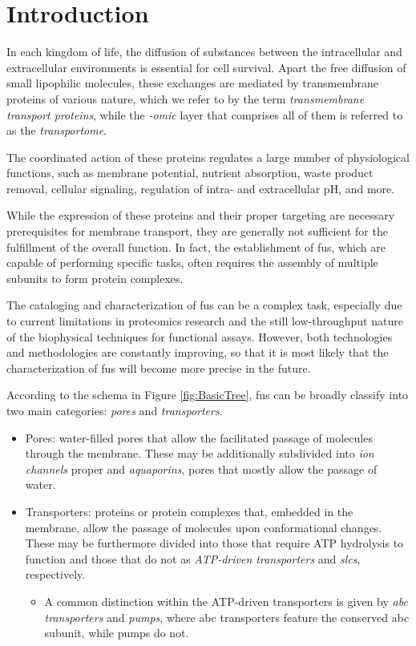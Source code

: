 \section{Introduction}

In each kingdom of life, the diffusion of substances between the intracellular and extracellular environments is essential for cell survival.
Apart the free diffusion of small lipophilic molecules, these exchanges are mediated by transmembrane proteins of various nature, which we refer to by the term \textit{transmembrane transport proteins}, while the \textit{-omic} layer that comprises all of them is referred to as the \textit{transportome}.

The coordinated action of these proteins regulates a large number of physiological functions, such as membrane potential, nutrient absorption, waste product removal, cellular signaling, regulation of intra- and extracellular pH, and more.

While the expression of these proteins and their proper targeting are necessary prerequisites for membrane transport, they are generally not sufficient for the fulfillment of the overall function.
In fact, the establishment of \glspl{fu}, which are capable of performing specific tasks, often requires the assembly of multiple subunits to form protein complexes.

The cataloging and characterization of \glspl{fu} can be a complex task, especially due to current limitations in proteomics research and the still low-throughput nature of the biophysical techniques for functional assays.
However, both technologies and methodologies are constantly improving, so that it is most likely that the characterization of \glspl{fu} will become more precise in the future.

According to the schema in Figure \ref{fig:BasicTree}, \glspl{fu} can be broadly classify into two main categories: \textit{pores} and \textit{transporters}.
\begin{itemize}
    \item Pores: water-filled pores that allow the facilitated passage of molecules through the membrane.
    These may be additionally subdivided into \textit{ion channels} proper and \textit{aquaporins}, pores that mostly allow the passage of water.
    \item Transporters: proteins or protein complexes that, embedded in the membrane, allow the passage of molecules upon conformational changes.
    These may be furthermore divided into those that require ATP hydrolysis to function and those that do not as \textit{ATP-driven transporters} and \textit{\glspl{slc}}, respectively.
    \begin{itemize}
        \item A common distinction within the ATP-driven transporters is given by \textit{\gls{abc} transporters} and \textit{pumps}, where \gls{abc} transporters feature the conserved \gls{abc} subunit, while pumps do not.
    \end{itemize}
\end{itemize}

